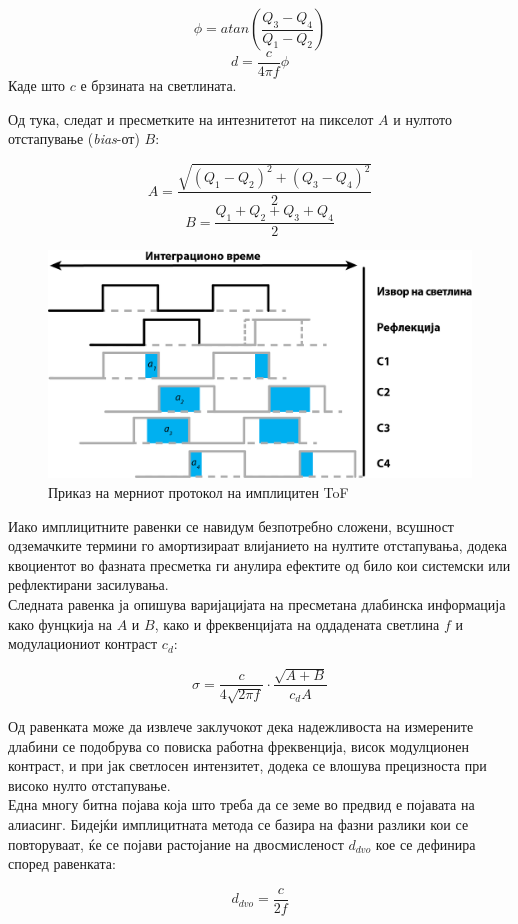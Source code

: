 \documentclass[12pt]{article}
\begin{document}
		$$ \phi = atan(\frac{Q_3 - Q_4}{Q_1 - Q_2}) $$
		$$ d = \frac{c}{4\pi f} \phi $$
		Каде што $c$ е брзината на светлината.


		Од тука, следат и пресметките на интезнитетот на пикселот $A$ и нултото отстапување (\textit{bias}-от) $B$:

		$$ A = \frac{\sqrt{(Q_1 - Q_2)^2  + (Q_3 - Q_4)^2}}{2} $$
		$$ B = \frac{Q_1 + Q_2 + Q_3 + Q_4}{2} $$


		\begin{figure}[H]
			\includegraphics[width=0.75\linewidth]{./images/CWToF.png}
			\centering
			\caption{Приказ на мерниот протокол на имплицитен ToF}
			\label{fig:CWToF.png}
			\end{figure}

		Иако имплицитните равенки се навидум безпотребно сложени, всушност одземачките термини го амортизираат влијанието на нултите отстапувања, додека квоциентот во фазната пресметка ги анулира ефектите од било кои системски или рефлектирани засилувања.\\
		Следната равенка ја опишува варијацијата на пресметана длабинска информација како фунцкија на $A$ и $B$, како и фреквенцијата на оддадената светлина $f$ и модулациониот контраст $c_d$:

		$$ \sigma = \frac{c}{4\sqrt{2\pi f}} \cdot \frac{\sqrt{A+B}}{c_d A} $$

		Од равенката може да извлече заклучокот дека надежливоста на измерените длабини се подобрува со повиска работна фреквенција, висок модулционен контраст, и при јак светлосен интензитет, додека се влошува прецизноста при високо нулто отстапување.
		\\
		Една многу битна појава која што треба да се земе во предвид е појавата на алиасинг. Бидејќи имплицитната метода се базира на фазни разлики кои се повторуваат, ќе се појави растојание на двосмисленост $d_{dvo}$ кое се дефинира според равенката:

		$$ d_{dvo} = \frac{c}{2f} $$
\end{document}
